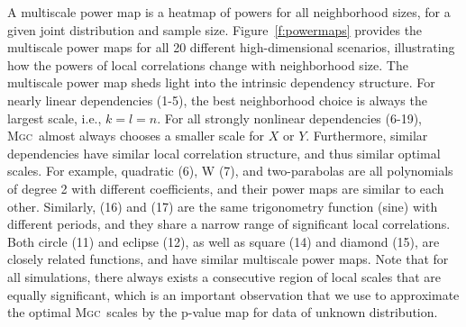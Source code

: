 \documentclass[11pt]{article}
\providecommand{\sct}[1]{{\normalfont\textsc{#1}}}
\newcommand{\Mgc}{\sct{Mgc}}
\begin{document}
A multiscale power map is a heatmap of powers for all neighborhood sizes, for a given joint distribution and sample size.
Figure~\ref{f:powermaps} provides the multiscale power maps for all 20 different high-dimensional scenarios, illustrating how the powers of local correlations change with  neighborhood size.
% 
The multiscale power map sheds light into the intrinsic dependency structure.
For nearly linear dependencies (1-5), the best neighborhood choice is always the largest scale, i.e., $k=l=n$. For all strongly nonlinear dependencies (6-19), \Mgc~almost always chooses a smaller scale for $X$ or $Y$.
Furthermore, similar dependencies have similar local correlation structure, and thus similar optimal scales. For example, quadratic (6),  W (7), and two-parabolas are all polynomials of degree 2 with different coefficients, and their power maps are  similar to each other. Similarly,  (16) and (17) are the same trigonometry function (sine) with different periods, and they share a narrow range of significant local correlations.
Both circle (11) and eclipse (12), as well as square (14) and diamond (15), are closely related functions, and have similar multiscale power maps.
% 
Note that for all simulations, there always exists a consecutive region of local scales that are equally significant, which is an important observation that we use to approximate the optimal \Mgc~scales by the p-value map for data of unknown distribution.
\end{document}
